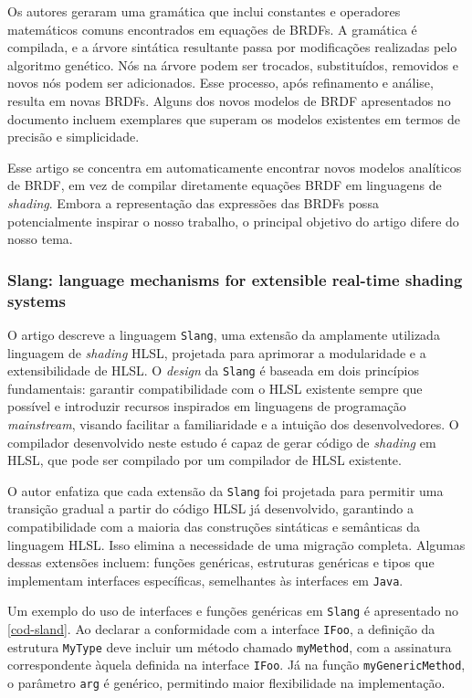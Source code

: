 Os autores geraram uma gramática que inclui constantes e operadores matemáticos comuns encontrados em equações de BRDFs. A gramática é compilada, e a árvore sintática resultante passa por modificações realizadas pelo algoritmo genético. Nós na árvore podem ser trocados, substituídos, removidos e novos nós podem ser adicionados. Esse processo, após refinamento e análise, resulta em novas BRDFs. Alguns dos novos modelos de BRDF apresentados no documento incluem exemplares que superam os modelos existentes em termos de precisão e simplicidade.
 
Esse artigo se concentra em automaticamente encontrar novos modelos analíticos de BRDF, em vez de compilar diretamente equações BRDF em linguagens de \textit{shading}. Embora a representação das expressões das BRDFs possa potencialmente inspirar o nosso trabalho, o principal objetivo do artigo difere do nosso tema.


\subsubsection{Slang: language mechanisms for extensible real-time shading systems}


O artigo descreve a linguagem \texttt{Slang}, uma extensão da amplamente utilizada linguagem de \textit{shading} HLSL, projetada para aprimorar a modularidade e a extensibilidade \cite{slang} de HLSL. O \textit{design} da \texttt{Slang} é baseada em dois princípios fundamentais: garantir compatibilidade com o HLSL existente sempre que possível e introduzir recursos inspirados em linguagens de programação \textit{mainstream}, visando facilitar a familiaridade e a intuição dos desenvolvedores. O compilador desenvolvido neste estudo é capaz de gerar código de \textit{shading} em HLSL, que pode ser compilado por um compilador de HLSL existente.

O autor enfatiza que cada extensão da \texttt{Slang} foi projetada para permitir uma transição gradual a partir do código HLSL já desenvolvido, garantindo a compatibilidade com a maioria das construções sintáticas e semânticas da linguagem HLSL. Isso elimina a necessidade de uma migração completa. Algumas dessas extensões incluem: funções genéricas, estruturas genéricas e tipos que implementam interfaces específicas, semelhantes às interfaces em \texttt{Java}.

Um exemplo do uso de interfaces e funções genéricas em \texttt{Slang} é apresentado no \autoref{cod-sland}. Ao declarar a conformidade com a interface \texttt{IFoo}, a definição da estrutura \texttt{MyType} deve incluir um método chamado \texttt{myMethod}, com a assinatura correspondente àquela definida na interface \texttt{IFoo}. Já na função \texttt{myGenericMethod}, o parâmetro \texttt{arg} é genérico, permitindo maior flexibilidade na implementação.

